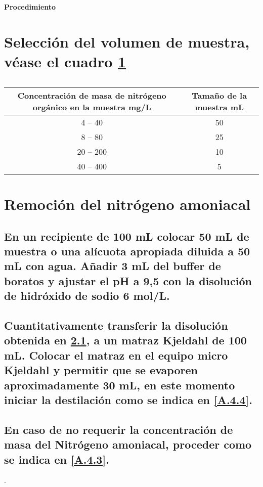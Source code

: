 \documentclass[spanish,12pt,letterpaper,titlepage]{article}
\theoremstyle{definition}
\begin{document}
	\pagestyle{fancy}
	\Large{\textbf{Procedimiento}}
	\normalsize
	\section{Selección del volumen de muestra, véase el cuadro \ref{tab:A1}}\label{A.4.1}
	\begin{table}[!h]
		\centering
		\caption{}
		\label{tab:A1}
		\begin{tabular}{|c|c|}
			\hline
			\rowcolor[HTML]{C0C0C0} 
			Concentración de masa de nitrógeno orgánico en la muestra mg/L & Tamaño de la muestra mL \\ \hline
			4 -- 40                                                        & 50                      \\ \hline
			8 -- 80                                                        & 25                      \\ \hline
			20 -- 200                                                      & 10                      \\ \hline
			40 -- 400                                                      & 5                       \\ \hline
		\end{tabular}
	\end{table}
	\section{Remoción del nitrógeno amoniacal}\label{A.4.2}
	\subsection{En un recipiente de 100 mL colocar 50 mL de muestra o una alícuota apropiada diluida a 50 mL con agua. Añadir 3 mL del buffer de boratos y ajustar el pH a 9,5 con la disolución de hidróxido de sodio 6 mol/L.}\label{A.4.2.1}
	\subsection{Cuantitativamente transferir la disolución obtenida en \ref{A.4.2.1}, a un matraz Kjeldahl de 100 mL. Colocar el matraz en el equipo micro Kjeldahl y permitir que se evaporen aproximadamente 30 mL, en este momento iniciar la destilación como se indica en \ref{A.4.4}.}\label{A.4.2.2}
	\subsection{En caso de no requerir la concentración de masa del Nitrógeno amoniacal, proceder como se indica en \ref{A.4.3}.}\label{A.4.2.3}.
\end{document}
